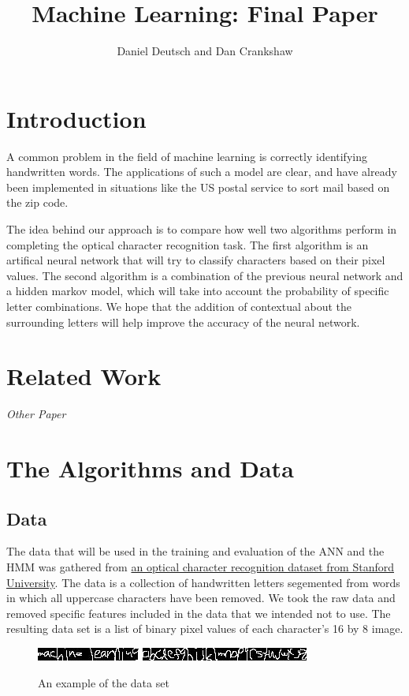 \documentclass[11pt,a4paper,twocolumn]{article}
\author{Daniel Deutsch and Dan Crankshaw}
\title{Machine Learning: Final Paper}
\date{}
\begin{document}
\maketitle

\section{Introduction}

A common problem in the field of machine learning is correctly identifying
handwritten words. The applications of
such a model are clear, and have already been implemented in situations like
the US postal service to sort mail based on the zip code.

The idea behind our approach is to compare how well two algorithms perform in
completing the optical character recognition task. The first algorithm is an
artifical neural network that will try to classify characters based on
their pixel values. The second algorithm is a combination of the previous
neural network and a hidden markov model, which will take into account the
probability of specific letter combinations. We hope that the addition of contextual
about the surrounding letters will help improve the accuracy of the neural
network.

\section{Related Work}

\emph{Other Paper} \cite{feng2008hidden}

\section{The Algorithms and Data}

\subsection*{Data}

The data that will be used in the training and evaluation of the ANN and the HMM was gathered from
\href{http://ai.stanford.edu/~btaskar/ocr/}{an optical character recognition dataset from
Stanford University}.
The data is a collection of handwritten letters segemented from words in which all uppercase
characters have been removed. We took the raw data and removed specific features included in the
data that we intended not to use. The resulting data set is a list of binary pixel values of each
character's 16 by 8 image.  \begin{figure}[h]
    \centering
    \includegraphics{img/ml.jpg}
    \includegraphics{img/alphabet.jpg}
    \caption{An example of the data set}
\end{figure}
\end{document}
